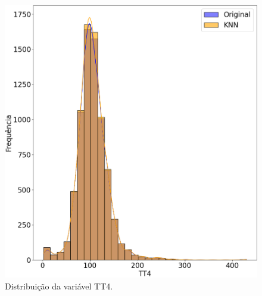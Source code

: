 \documentclass[11pt]{article}
\begin{document}
\begin{figure}[H]
\begin{minipage}{0.48\textwidth}
        \centering
        \includegraphics[width=\textwidth]{img/TT4_distrib.png}
        \caption{Distribuição da variável TT4.}
        \label{fig:TT4_distrib}
    \end{minipage}
\end{figure}
\end{document}
